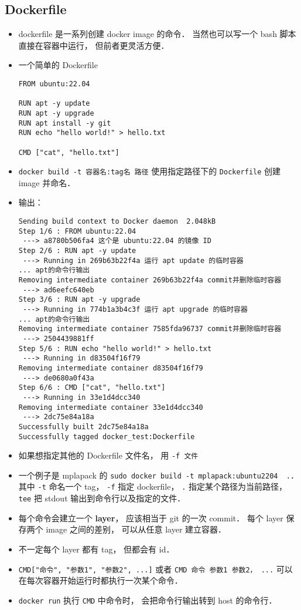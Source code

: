 \subsection{Dockerfile}
\begin{itemize}
\item dockerfile 是一系列创建 docker image 的命令． 当然也可以写一个 bash 脚本直接在容器中运行， 但前者更灵活方便．
\item 一个简单的 Dockerfile
\begin{lstlisting}[language=none]
FROM ubuntu:22.04

RUN apt -y update
RUN apt -y upgrade
RUN apt install -y git
RUN echo "hello world!" > hello.txt

CMD ["cat", "hello.txt"]
\end{lstlisting}
\item \verb|docker build -t 容器名:tag名 路径| 使用指定路径下的 \verb|Dockerfile| 创建 image 并命名．
\item 输出：
\begin{lstlisting}[language=none]
Sending build context to Docker daemon  2.048kB
Step 1/6 : FROM ubuntu:22.04
 ---> a8780b506fa4 这个是 ubuntu:22.04 的镜像 ID
Step 2/6 : RUN apt -y update
 ---> Running in 269b63b22f4a 运行 apt update 的临时容器
... apt的命令行输出
Removing intermediate container 269b63b22f4a commit并删除临时容器
 ---> ad6eefc640eb
Step 3/6 : RUN apt -y upgrade
 ---> Running in 774b1a3b4c3f 运行 apt upgrade 的临时容器
... apt的命令行输出
Removing intermediate container 7585fda96737 commit并删除临时容器
 ---> 2504439881ff
Step 5/6 : RUN echo "hello world!" > hello.txt
 ---> Running in d83504f16f79
Removing intermediate container d83504f16f79
 ---> de0680a0f43a
Step 6/6 : CMD ["cat", "hello.txt"]
 ---> Running in 33e1d4dcc340
Removing intermediate container 33e1d4dcc340
 ---> 2dc75e84a18a
Successfully built 2dc75e84a18a
Successfully tagged docker_test:Dockerfile
\end{lstlisting}
\item 如果想指定其他的 Dockerfile 文件名， 用 \verb|-f 文件|
\item 一个例子是 mplapack 的 \verb|sudo docker build -t mplapack:ubuntu2204  .|． 其中 \verb|-t| 命名一个 tag， \verb|-f| 指定 dockerfile， \verb|.| 指定某个路径为当前路径， \verb|tee| 把 stdout 输出到命令行以及指定的文件．
\item 每个命令会建立一个 \textbf{layer}， 应该相当于 git 的一次 commit． 每个 layer 保存两个 image 之间的差别， 可以从任意 layer 建立容器．
\item 不一定每个 layer 都有 tag， 但都会有 id．
\item \verb|CMD["命令", "参数1", "参数2", ...]| 或者 \verb|CMD 命令 参数1 参数2， ...| 可以在每次容器开始运行时都执行一次某个命令．
\item \verb|docker run| 执行 \verb|CMD| 中命令时， 会把命令行输出转到 host 的命令行．
\end{itemize}

